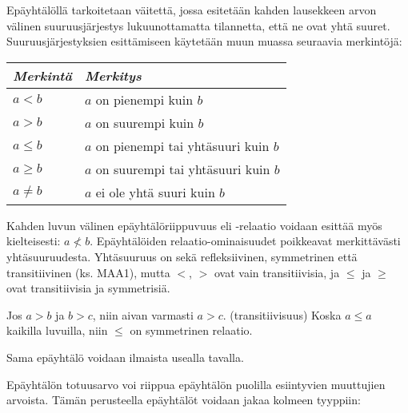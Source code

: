 Epäyhtälöllä tarkoitetaan väitettä, jossa esitetään kahden lausekkeen arvon välinen suuruusjärjestys lukuunottamatta tilannetta, että ne ovat yhtä suuret. Suuruusjärjestyksien esittämiseen käytetään muun muassa seuraavia merkintöjä:

\begin{center}
\begin{tabular}{l|l}
\emph{Merkintä} & \emph{Merkitys} \\
\hline
$a<b$ &  $a$ on pienempi kuin $b$ \\
$a>b$ & $a$ on suurempi kuin $b$ \\
$a \leq b$ & $a$ on pienempi tai yhtäsuuri kuin $b$ \\
$a \geq b$ & $a$ on suurempi tai yhtäsuuri kuin $b$ \\
$a \neq b$ & $a$ ei ole yhtä suuri kuin $b$ \\
\end{tabular}
\end{center}

Kahden luvun välinen epäyhtälöriippuvuus eli -relaatio voidaan esittää myös kielteisesti: $a \nless b $. Epäyhtälöiden relaatio-ominaisuudet poikkeavat merkittävästi yhtäsuuruudesta. Yhtäsuuruus on sekä refleksiivinen, symmetrinen että transitiivinen (ks. MAA1), mutta $<$, $>$ ovat vain transitiivisia, ja $\leq$ ja $\geq$ ovat transitiivisia ja symmetrisiä.

\begin{esimerkki}
Jos $a>b$ ja $b>c$, niin aivan varmasti $a>c$. (transitiivisuus)
Koska $a \leq a$ kaikilla luvuilla, niin $\leq$ on symmetrinen relaatio.
\end{esimerkki}

Sama epäyhtälö voidaan ilmaista usealla tavalla.

\begin{esimerkki}
\end{esimerkki}

Epäyhtälön totuusarvo voi riippua epäyhtälön puolilla esiintyvien muuttujien arvoista. Tämän perusteella epäyhtälöt voidaan jakaa kolmeen tyyppiin:


